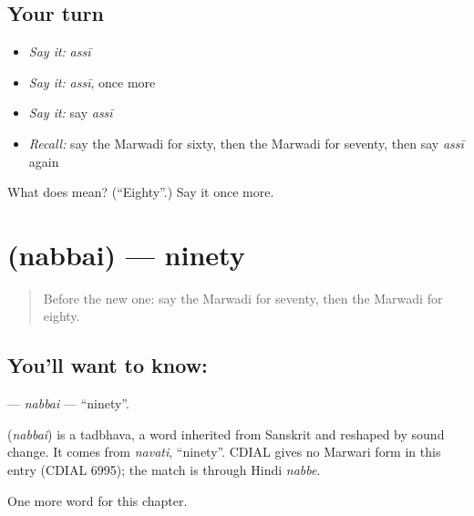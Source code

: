 \subsection*{Your turn}
\begin{itemize}
\raggedright
  \item \emph{Say it:} \emph{assī}
  \item \emph{Say it:} \emph{assī}, once more
  \item \emph{Say it:} say \emph{assī}
  \item \emph{Recall:} say the Marwadi for sixty, then the Marwadi for seventy, then say \emph{assī} again
\end{itemize}

\begin{tcolorbox}[breakable,colback=teal!4,colframe=teal!35!black,title={Before you move on}]
What does  mean? (\textquotedblleft{}Eighty\textquotedblright{}.) Say it once more.
\end{tcolorbox}
\section[\texorpdfstring{\mw{नब्बै} (nabbai)}{नब्बै (nabbai)}]{ (nabbai) — ninety}

\label{lesson:MW-C87-nabbai}



\begin{quote}
Before the new one: say the Marwadi for seventy, then the Marwadi for eighty.
\end{quote}

\subsection*{You'll want to know: }
\textbf{} — \emph{nabbai} — \textquotedblleft{}ninety\textquotedblright{}.

\begin{cousinweb}
\textbf{} (\emph{nabbai}) is a tadbhava, a word inherited from Sanskrit and reshaped by sound change. It comes from \emph{navati}, \textquotedblleft{}ninety\textquotedblright{}. CDIAL gives no Marwari form in this entry (CDIAL 6995); the match is through Hindi \emph{nabbe}.
\end{cousinweb}

\begin{grammarlens}[title={What you've built}]
One more word for this chapter.
\end{grammarlens}

